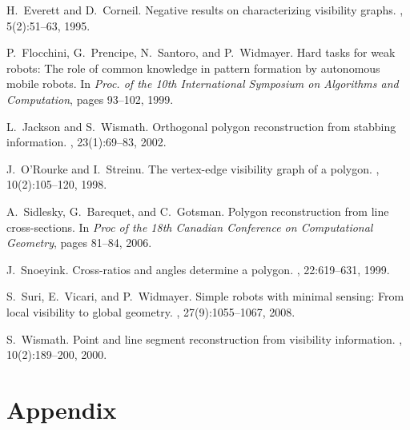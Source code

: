\documentclass[11pt]{article}
\begin{document}
\begin{thebibliography}{10}
H.~Everett and D.~Corneil.
\newblock Negative results on characterizing visibility graphs.
, 5(2):51--63,
  1995.

P.~Flocchini, G.~Prencipe, N.~Santoro, and P.~Widmayer.
\newblock Hard tasks for weak robots: {The} role of common knowledge in pattern
  formation by autonomous mobile robots.
\newblock In {\em Proc. of the 10th International Symposium on Algorithms and
  Computation}, pages 93--102, 1999.

L.~Jackson and S.~Wismath.
\newblock Orthogonal polygon reconstruction from stabbing information.
, 23(1):69--83,
  2002.

J.~O'Rourke and I.~Streinu.
\newblock The vertex-edge visibility graph of a polygon.
,
  10(2):105--120, 1998.

A.~Sidlesky, G.~Barequet, and C.~Gotsman.
\newblock Polygon reconstruction from line cross-sections.
\newblock In {\em Proc of the 18th Canadian Conference on Computational
  Geometry}, pages 81--84, 2006.

J.~Snoeyink.
\newblock Cross-ratios and angles determine a polygon.
, 22:619--631, 1999.

S.~Suri, E.~Vicari, and P.~Widmayer.
\newblock Simple robots with minimal sensing: {From} local visibility to global
  geometry.
, 27(9):1055--1067,
  2008.

S.~Wismath.
\newblock Point and line segment reconstruction from visibility information.
, 10(2):189--200, 2000.

\end{thebibliography}



\newpage
\normalsize
\appendix
\section*{Appendix}
\end{document}
